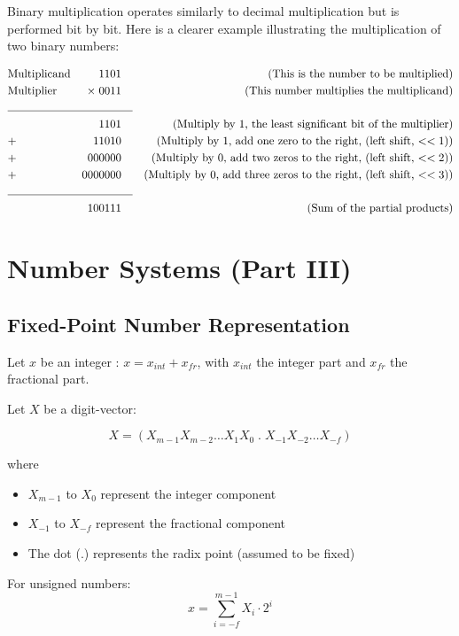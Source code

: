 \documentclass[12pt,openany]{book}
\begin{document}
		  
		
		\newpage
		Binary multiplication operates similarly to decimal multiplication but is performed bit by bit. Here is a clearer example illustrating the multiplication of two binary numbers:
		
		\begin{align*}
			  & \text{Multiplicand} & 1101           & \quad & \text{(This is the number to be multiplied)}                              \\
			  & \text{Multiplier}   & \times \; 0011 &       & \text{(This number multiplies the multiplicand)}                          \\
			\cline{2-4}
			  &                     & 1101           &       & \text{(Multiply by 1, the least significant bit of the multiplier)}       \\
			  & +                   & 11010          &       & \text{(Multiply by 1, add one zero to the right, (left shift, $<<1$))}    \\
			  & +                   & 000000         &       & \text{(Multiply by 0, add two zeros to the right, (left shift, $<<2$))}   \\
			  & +                   & 0000000        &       & \text{(Multiply by 0, add three zeros to the right, (left shift, $<<3$))} \\
			\cline{2-4}
			  &                     & 100111         &       & \text{(Sum of the partial products)}                                      
		\end{align*}
		
		
		
		
		\chapter{Number Systems (Part III)}
		\section{Fixed-Point
		Number Representation}  
		
		Let \(x\) be an integer :
		$x  = x_{int} + x_{fr}$, with $x_{int}$ the integer part and $x_{fr}$ the fractional part.
		
		Let \( X \) be a digit-vector:
		
		\[ X = (X_{m-1} X_{m-2} \dots X_1 X_0 \; . \;  X_{-1} X_{-2} \dots X_{-f}) \]
		
		where
		\begin{itemize}
			\item[] \( X_{m-1} \) to \( X_0 \) represent the integer component
			\item[] \( X_{-1} \) to \( X_{-f} \) represent the fractional component
			\item[] The dot (.) represents the radix point (assumed to be fixed)
		\end{itemize}
		\vskip 0.5cm
		For unsigned numbers:
		\[ x = \sum_{i=-f}^{m-1} X_i \cdot 2^i \]
		
\end{document}
